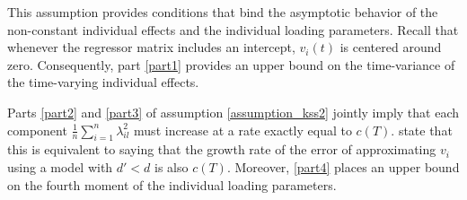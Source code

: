     This assumption provides conditions that bind the asymptotic behavior of the non-constant individual effects and the individual loading parameters. Recall that whenever the regressor matrix includes an intercept, \( v_i(t) \) is centered around zero. Consequently, part \ref{part1} provides an upper bound on the time-variance of the time-varying individual effects.  
    
    Parts \ref{part2} and \ref{part3} of assumption \ref{assumption_kss2} jointly imply that each component $\frac{1}{n} \sum_{i=1}^n \lambda_{il}^2$ must increase at a rate exactly equal to $c(T)$. \citet{kneip2012new} state that this is equivalent to saying that the growth rate of the error of approximating \(v_i\) using a model with \(d' < d\) is also \(c(T)\).  Moreover, \ref{part4} places an upper bound on the fourth moment of the individual loading parameters.


